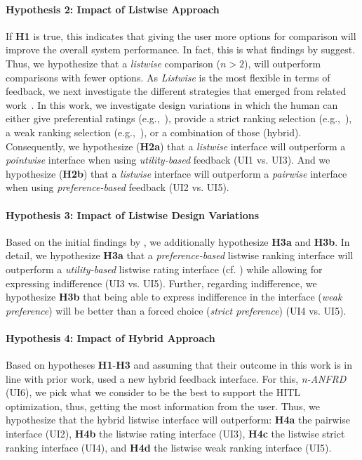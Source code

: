 \documentclass[acmsmall,screen,nonacm]{acmart}
\begin{document}
\paragraph{Hypothesis 2: Impact of Listwise Approach} If \textbf{H1} is true, this indicates that giving the user more options for comparison will improve the overall system performance. In fact, this is what findings by \citet{cao2007learning} suggest. Thus, we hypothesize that a \textit{listwise} comparison ($n > 2$), will outperform comparisons with fewer options.
As \textit{Listwise} is the most flexible in terms of feedback, we next investigate the different strategies that emerged from related work~\cite{koyama2017sequential, koyama2020sequential, mikkola2020projective}. In this work, we investigate design variations in which the human can either give preferential ratings (e.g.,~\citet{koyama2014crowd}), provide a strict ranking selection (e.g.,~\citet{koyama2020sequential}), a weak ranking selection (e.g.,~\citet{marks1997design-galleries}), or a combination of those (hybrid).
Consequently, we hypothesize (\textbf{H2a}) that a \textit{listwise} interface will outperform a \textit{pointwise} interface when using \textit{utility-based} feedback (UI1 vs. UI3).
And we hypothesize (\textbf{H2b}) that a \textit{listwise} interface will outperform a \textit{pairwise} interface when using \textit{preference-based} feedback (UI2 vs. UI5).

\paragraph{Hypothesis 3: Impact of Listwise Design Variations} Based on the initial findings by \citet{mikkola2020projective}, we additionally hypothesize \textbf{H3a} and \textbf{H3b}. In detail, we hypothesize \textbf{H3a} that a \textit{preference-based} listwise ranking interface will outperform a \textit{utility-based} listwise rating interface (cf. \cite{brochu2007material-design, brochu2007active, brochu2010animation}) while allowing for expressing indifference (UI3 vs. UI5). Further, regarding indifference, we hypothesize \textbf{H3b} that being able to express indifference in the interface (\textit{weak preference}) will be better than a forced choice (\textit{strict preference}) (UI4 vs. UI5).

\paragraph{Hypothesis 4: Impact of Hybrid Approach} Based on hypotheses \textbf{H1}-\textbf{H3} and assuming that their outcome in this work is in line with prior work, %
\citet{ou2023expertise} used a new hybrid feedback interface. For this, \textit{n-ANFRD} (UI6), we pick what we consider to be the best to support the HITL optimization, thus, getting the most information from the user. Thus, we hypothesize that the hybrid listwise interface will outperform: \textbf{H4a} the pairwise interface (UI2), \textbf{H4b} the listwise rating interface (UI3), \textbf{H4c} the listwise strict ranking interface (UI4), and \textbf{H4d} the listwise weak ranking interface (UI5).
\end{document}
